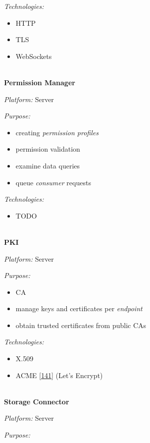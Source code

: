 \documentclass[12pt,english,a4paper,titlepage,cleardoublepage=empty,dottedtoc]{report}
\providecommand{\tightlist}{%
  \setlength{\itemsep}{0pt}\setlength{\parskip}{0pt}}
\begin{document}
\emph{Technologies:}

\begin{itemize}
\tightlist
\item
  HTTP
\item
  TLS
\item
  WebSockets
\end{itemize}

~\\
\textbf{Permission Manager}

\emph{Platform:} Server

\emph{Purpose:}

\begin{itemize}
\tightlist
\item
  creating \emph{permission profiles}
\item
  permission validation
\item
  examine data queries
\item
  queue \emph{consumer} requests
\end{itemize}

\emph{Technologies:}

\begin{itemize}
\tightlist
\item
  TODO
\end{itemize}

~\\
\textbf{PKI}

\emph{Platform:} Server

\emph{Purpose:}

\begin{itemize}
\tightlist
\item
  CA
\item
  manage keys and certificates per \emph{endpoint}
\item
  obtain trusted certificates from public CAs
\end{itemize}

\emph{Technologies:}

\begin{itemize}
\tightlist
\item
  X.509
\item
  ACME {[}\protect\hyperlink{ref-web_spec_acme}{141}{]} (Let's Encrypt)
\end{itemize}

~\\
\textbf{Storage Connector}

\emph{Platform:} Server

\emph{Purpose:}
\end{document}

